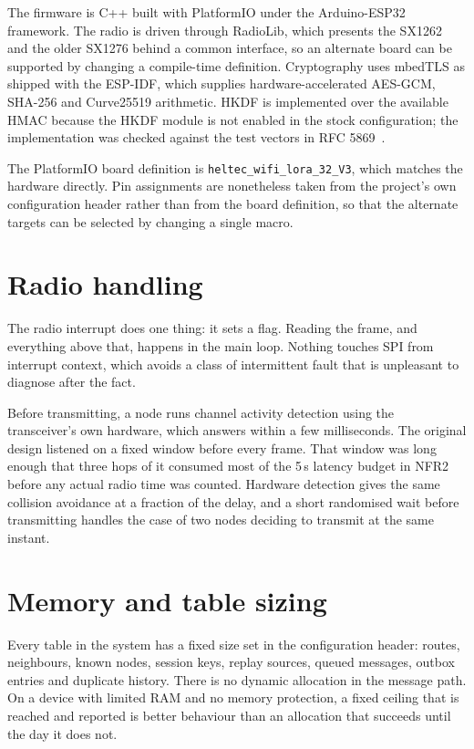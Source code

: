 \documentclass[12pt,a4paper,oneside]{report}
\begin{document}
The firmware is C++ built with PlatformIO under the Arduino-ESP32 framework. The
radio is driven through RadioLib, which presents the SX1262 and the older SX1276
behind a common interface, so an alternate board can be supported by changing a
compile-time definition. Cryptography uses mbedTLS as shipped with the ESP-IDF,
which supplies hardware-accelerated AES-GCM, SHA-256 and Curve25519 arithmetic.
HKDF is implemented over the available HMAC because the HKDF module is not
enabled in the stock configuration; the implementation was checked against the
test vectors in RFC 5869~\cite{rfc5869}.

The PlatformIO board definition is \texttt{heltec\_wifi\_lora\_32\_V3}, which
matches the hardware directly. Pin assignments are nonetheless taken from the
project's own configuration header rather than from the board definition, so
that the alternate targets can be selected by changing a single macro.

\section{Radio handling}
\label{sec:lbt}

The radio interrupt does one thing: it sets a flag. Reading the frame, and
everything above that, happens in the main loop. Nothing touches SPI from
interrupt context, which avoids a class of intermittent fault that is
unpleasant to diagnose after the fact.

Before transmitting, a node runs channel activity detection using the
transceiver's own hardware, which answers within a few milliseconds. The original
design listened on a fixed window before every frame. That window was long enough
that three hops of it consumed most of the 5\,s latency budget in NFR2 before any
actual radio time was counted. Hardware detection gives the same collision
avoidance at a fraction of the delay, and a short randomised wait before
transmitting handles the case of two nodes deciding to transmit at the same
instant.

\section{Memory and table sizing}

Every table in the system has a fixed size set in the configuration header:
routes, neighbours, known nodes, session keys, replay sources, queued messages,
outbox entries and duplicate history. There is no dynamic allocation in the
message path. On a device with limited RAM and no memory protection, a fixed
ceiling that is reached and reported is better behaviour than an allocation that
succeeds until the day it does not.
\end{document}
